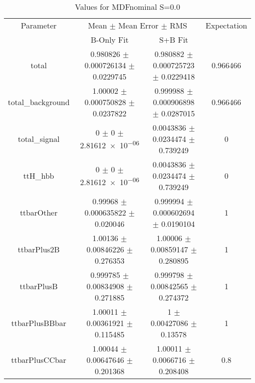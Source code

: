 \begin{table}
\centering
\caption{Values for MDFnominal S=0.0}
\begin{tabular}{cccc}
\toprule
Parameter & \multicolumn{2}{c}{Mean $\pm$ Mean Error $\pm$ RMS} & Expectation\\
 & B-Only Fit & S+B Fit & \\
\midrule
total & \num{0.980826} $\pm$ \num{0.000726134} $\pm$ \num{0.0229745} & \num{0.980882} $\pm$ \num{0.000725723} $\pm$ \num{0.0229418} & \num{0.966466}\\
total\_background & \num{1.00002} $\pm$ \num{0.000750828} $\pm$ \num{0.0237822} & \num{0.999988} $\pm$ \num{0.000906898} $\pm$ \num{0.0287015} & \num{0.966466}\\
total\_signal & \num{0} $\pm$ \num{0} $\pm$ \num{2.81612e-06} & \num{0.0043836} $\pm$ \num{0.0234474} $\pm$ \num{0.739249} & \num{0}\\
ttH\_hbb & \num{0} $\pm$ \num{0} $\pm$ \num{2.81612e-06} & \num{0.0043836} $\pm$ \num{0.0234474} $\pm$ \num{0.739249} & \num{0}\\
ttbarOther & \num{0.99968} $\pm$ \num{0.000635822} $\pm$ \num{0.020046} & \num{0.999994} $\pm$ \num{0.000602694} $\pm$ \num{0.0190104} & \num{1}\\
ttbarPlus2B & \num{1.00136} $\pm$ \num{0.00846226} $\pm$ \num{0.276353} & \num{1.00006} $\pm$ \num{0.00859147} $\pm$ \num{0.280895} & \num{1}\\
ttbarPlusB & \num{0.999785} $\pm$ \num{0.00834908} $\pm$ \num{0.271885} & \num{0.999798} $\pm$ \num{0.00842565} $\pm$ \num{0.274372} & \num{1}\\
ttbarPlusBBbar & \num{1.00011} $\pm$ \num{0.00361921} $\pm$ \num{0.115485} & \num{1} $\pm$ \num{0.00427086} $\pm$ \num{0.13578} & \num{1}\\
ttbarPlusCCbar & \num{1.00044} $\pm$ \num{0.00647646} $\pm$ \num{0.201368} & \num{1.00011} $\pm$ \num{0.0066716} $\pm$ \num{0.208408} & \num{0.8}\\
\bottomrule
\end{tabular}
\end{table}